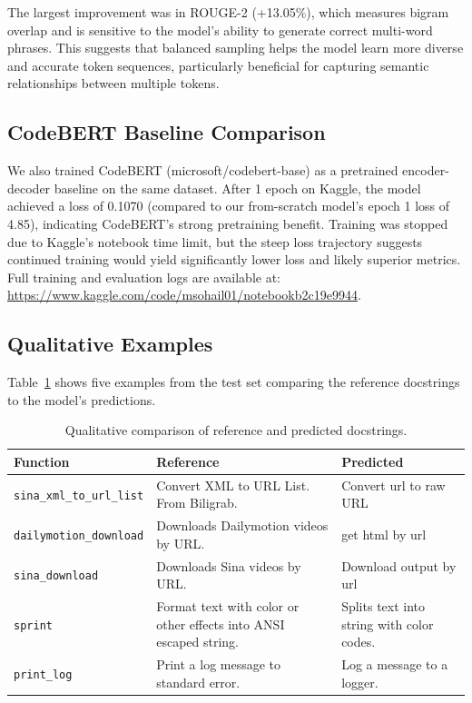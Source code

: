 \documentclass[11pt]{article}
\begin{document}
The largest improvement was in ROUGE-2 (+13.05\%), which measures bigram overlap and is sensitive to the model's ability to generate correct multi-word phrases. This suggests that balanced sampling helps the model learn more diverse and accurate token sequences, particularly beneficial for capturing semantic relationships between multiple tokens.

\subsection{CodeBERT Baseline Comparison}

We also trained CodeBERT (microsoft/codebert-base) as a pretrained encoder-decoder baseline on the same dataset. After 1 epoch on Kaggle, the model achieved a loss of 0.1070 (compared to our from-scratch model's epoch 1 loss of 4.85), indicating CodeBERT's strong pretraining benefit. Training was stopped due to Kaggle's notebook time limit, but the steep loss trajectory suggests continued training would yield significantly lower loss and likely superior metrics. Full training and evaluation logs are available at: \url{https://www.kaggle.com/code/msohail01/notebookb2c19e9944}.

\subsection{Qualitative Examples}

Table~\ref{tab:qualitative} shows five examples from the test set comparing the reference docstrings to the model's predictions.

\begin{table}[h]
\centering
\small
\begin{tabular}{@{}p{4.5cm}p{4.5cm}p{4.5cm}@{}}
\toprule
\textbf{Function} & \textbf{Reference} & \textbf{Predicted} \\
\midrule
\texttt{sina\_xml\_to\_url\_list} & Convert XML to URL List. From Biligrab. & Convert url to raw URL \\
\texttt{dailymotion\_download} & Downloads Dailymotion videos by URL. & get html by url \\
\texttt{sina\_download} & Downloads Sina videos by URL. & Download output by url \\
\texttt{sprint} & Format text with color or other effects into ANSI escaped string. & Splits text into string with color codes. \\
\texttt{print\_log} & Print a log message to standard error. & Log a message to a logger. \\
\bottomrule
\end{tabular}
\caption{Qualitative comparison of reference and predicted docstrings.}
\label{tab:qualitative}
\end{table}
\end{document}
